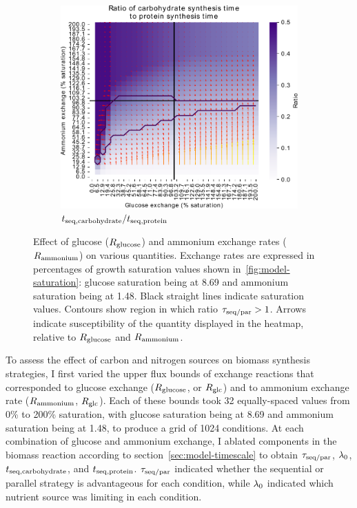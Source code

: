 \begin{figure}
  \begin{subfigure}[t]{0.45\textwidth}
  \centering
    \includegraphics[width=\linewidth]{ec_grid_glc_amm_carb_to_prot}
    \caption{
      $t_{\mathrm{seq},\mathrm{carbohydrate}}/t_{\mathrm{seq},\mathrm{protein}}$
    }
    \label{fig:model-grid-glc-carb-to-prot}
  \end{subfigure}
  \caption{
    Effect of glucose ($R_{\mathrm{glucose}}$) and ammonium exchange rates ($R_{\mathrm{ammonium}}$) on various quantities.
    Exchange rates are expressed in percentages of growth saturation values shown in~\ref{fig:model-saturation}: glucose saturation being at \SI{8.69}{\mmolgdwh} and ammonium saturation being at \SI{1.48}{\mmolgdwh}.
    Black straight lines indicate saturation values.
    Contours show region in which ratio $\tau_{\mathrm{seq}/\mathrm{par}} > 1$.
    Arrows indicate susceptibility of the quantity displayed in the heatmap, relative to $R_{\mathrm{glucose}}$ and $R_{\mathrm{ammonium}}$.
  }
  \label{fig:model-grid-glc}
\end{figure}

To assess the effect of carbon and nitrogen sources on biomass synthesis strategies, I first varied the upper flux bounds of exchange reactions that corresponded to glucose exchange ($R_{\mathrm{glucose}}$, or $R_{\mathrm{glc}}$) and to ammonium exchange rate ($R_{\mathrm{ammonium}}$, $R_{\mathrm{glc}}$).
Each of these bounds took 32 equally-spaced values from 0\% to 200\% saturation, with glucose saturation being at \SI{8.69}{\mmolgdwh} and ammonium saturation being at \SI{1.48}{\mmolgdwh}, to produce a grid of \num{1024} conditions.
At each combination of glucose and ammonium exchange, I ablated components in the biomass reaction according to section~\ref{sec:model-timescale} to obtain $\tau_{\mathrm{seq}/\mathrm{par}}$, $\lambda_{0}$, $t_{\mathrm{seq},\mathrm{carbohydrate}}$, and $t_{\mathrm{seq},\mathrm{protein}}$.
$\tau_{\mathrm{seq}/\mathrm{par}}$ indicated whether the sequential or parallel strategy is advantageous for each condition, while $\lambda_{0}$ indicated which nutrient source was limiting in each condition.

